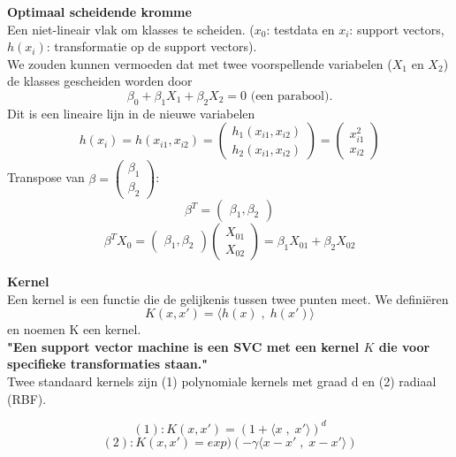 {\textbf{Optimaal scheidende kromme}\\
Een niet-lineair vlak om klasses te scheiden. ($x_0$: testdata en $x_i$: support vectors, $h(x_i)$: transformatie op de support vectors).\\

\noindent We zouden kunnen vermoeden dat met twee voorspellende variabelen ($X_1$ en $X_2$) de klasses gescheiden worden door
\[\beta_0+\beta_1X_1+\beta_2X_2=0 \textrm{ (een parabool)}.\]
Dit is een lineaire lijn in de nieuwe variabelen
\[h(x_i)=h(x_{i1},x_{i2})=
\begin{pmatrix}
h_1(x_{i1},x_{i2})\\
h_2(x_{i1},x_{i2})
\end{pmatrix}=
\begin{pmatrix}
x_{i1}^2\\
x_{i2}
\end{pmatrix}
\]
Transpose van $\beta=\begin{pmatrix}
\beta_1\\
\beta_2
\end{pmatrix}$:\[ \beta^T=\begin{pmatrix}
\beta_1, \beta_2
\end{pmatrix}\]
\[\beta^TX_0=\begin{pmatrix}
\beta_1, \beta_2
\end{pmatrix}\begin{pmatrix}
X_{01}\\
X_{02}
\end{pmatrix}=\beta_1X_{01}+\beta_2X_{02}\]

\textbf{Kernel}\\
Een kernel is een functie die de gelijkenis tussen twee punten meet. We definiëren \[K(x,x')=\langle h(x) \; , \; h(x') \rangle\] en noemen K een kernel.\\

\textbf{"Een support vector machine is een SVC met een kernel $K$ die voor specifieke transformaties staan."}\\

\noindent
Twee standaard kernels zijn (1) polynomiale kernels met graad d en (2) radiaal (RBF).

\[
(1): K(x,x')=(1+\langle x \; , \; x' \rangle)^d
\]
\[
(2): K(x,x')=exp)(-\gamma \langle x-x' \; , \; x-x' \rangle)
\]

}
